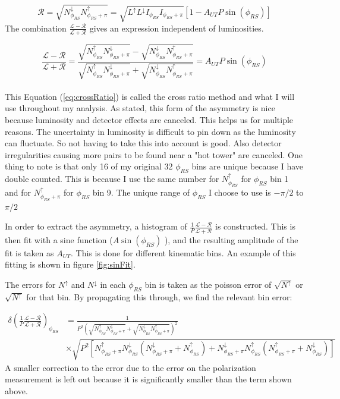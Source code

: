 \documentclass[abstract = on,listof=totoc, bibliography=totoc]{scrreprt}
\newcommand{\phirs}{\phi_{RS}}
\newcommand{\nup}{N^\uparrow}
\newcommand{\ndw}{N^\downarrow}
\begin{document}
\begin{equation}
\mathcal{R} = \sqrt{N^\downarrow_{\phi_{RS}}N^\uparrow_{\phi_{RS}+\pi}} = \sqrt{L^\uparrow L^\downarrow I_{\phi_{RS}} I_{\phi_{RS}+\pi}} \left[ 1-A_{UT}P\sin(\phi_{RS})\right]
\end{equation}
%
The combination $\frac{\mathcal{L} - \mathcal{R}}{\mathcal{L} + \mathcal{R}}$  gives an expression independent of luminosities. 

\begin{equation}
\label{eq:crossRatio}
\frac{\mathcal{L} - \mathcal{R}}{\mathcal{L} +\mathcal{R}} = \frac{\sqrt{N^\uparrow_{\phi_{RS}}N^\downarrow_{\phi_{RS}+\pi}} - \sqrt{N^\downarrow_{\phi_{RS}}N^\uparrow_{\phi_{RS}+\pi}}}{\sqrt{N^\uparrow_{\phi_{RS}}N^\downarrow_{\phi_{RS}+\pi}} + \sqrt{N^\downarrow_{\phi_{RS}}N^\uparrow_{\phi_{RS}+\pi}}} = A_{UT}P\sin(\phi_{RS})
\end{equation}\\

This Equation (\ref{eq:crossRatio}) is called the cross ratio method and what I will use throughout my analysis. As stated, this form of the asymmetry is nice because luminosity and detector effects are canceled. This helps us for multiple reasons. The uncertainty in luminosity is difficult to pin down as the luminosity can fluctuate. So not having to take this into account is good. Also detector irregularities causing more pairs to be found near a "hot tower" are canceled. One thing to note is that only 16 of my original 32 $\phi_{RS}$ bins are unique because I have double counted. This is because I use the same number for $N^\uparrow_{\phi_{RS}}$ for $\phi_{RS}$ bin 1 and for $N^\uparrow_{\phi_{RS}+\pi}$ for $\phi_{RS}$ bin 9. The unique range of $\phi_{RS}$ I choose to use is $-\pi/2$ to $\pi/2$

In order to extract the asymmetry, a histogram of $\frac{1}{P}\frac{\mathcal{L} - \mathcal{R}}{\mathcal{L} + \mathcal{R}}$ is constructed. This is then fit with a sine function ($A\sin(\phirs)$ ), and the resulting amplitude of the fit is taken as $A_{UT}$. This is done for different kinematic bins. An example of this fitting is shown in figure \ref{fig:sinFit}. 

The errors for $N^\uparrow$ and $N^\downarrow$ in each $\phirs$ bin is taken as the poisson error of $\sqrt{N^\uparrow}$ or $\sqrt{N^\uparrow}$ for that bin. By propagating this through, we find the relevant bin error:

\begin{align}
\delta\left(\frac{1}{P}\frac{\mathcal{L} - \mathcal{R}}{\mathcal{L} + \mathcal{R}}\right)_{\phirs} & = \frac{1}{P^2 \left(\sqrt{\nup_{\phirs} \ndw_{\phirs+\pi}} + \sqrt{\ndw_{\phirs}\nup_{\phirs + \pi}}\right)^2} \nonumber \\
& \times \sqrt{P^2\left[   \nup_{\phirs+\pi} \ndw_{\phirs} \left( \ndw_{\phirs+\pi} + \nup_{\phirs}\right) +  \ndw_{\phirs+\pi} \nup_{\phirs} \left( \nup_{\phirs+\pi} + \ndw_{\phirs}\right) \right]}
\end{align}
%
A smaller correction to the error due to the error on the polarization measurement is left out because it is significantly smaller than the term shown above.
\end{document}
